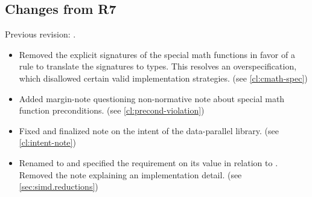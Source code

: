 \subsection{Changes from R7}
Previous revision: \parencite{P0214R7}.
\begin{itemize}
  \item Removed the explicit signatures of the special math functions in favor of a rule to translate the  signatures to \simd types.
    This resolves an overspecification, which disallowed certain valid implementation strategies. (see \ref{cl:cmath-spec})

  \item Added margin-note questioning non-normative note about special math function preconditions. (see \ref{cl:precond-violation})

  \item Fixed and finalized note on the intent of the data-parallel library. (see \ref{cl:intent-note})

  \item Renamed  to  and specified the requirement on its value in relation to . Removed the note explaining an implementation detail. (see \ref{sec:simd.reductions})
\end{itemize}


